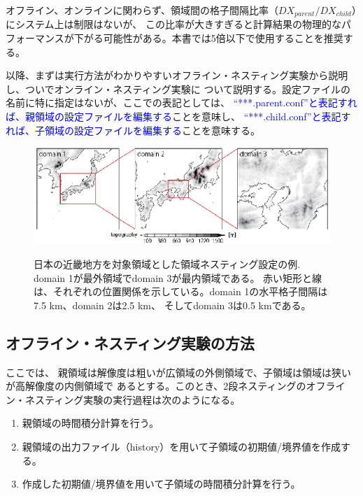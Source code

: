 オフライン、オンラインに関わらず、領域間の格子間隔比率（$DX_{parent}/DX_{child}$）にシステム上は制限はないが、
この比率が大きすぎると計算結果の物理的なパフォーマンスが下がる可能性がある。本書では5倍以下で使用することを推奨する。

以降、まずは実行方法がわかりやすいオフライン・ネスティング実験から説明し、ついでオンライン・ネスティング実験に
ついて説明する。設定ファイルの名前に特に指定はないが、ここでの表記としては、
\textcolor{blue}{``***.parent.conf''と表記すれば、親領域の設定ファイルを編集する}ことを意味し、
\textcolor{blue}{``***.child.conf''と表記すれば、子領域の設定ファイルを編集する}ことを意味する。


\begin{figure}[t]
\begin{center}
  \includegraphics[width=1.0\hsize]{./figure/nesting_sample.eps}\\
  \caption{日本の近畿地方を対象領域とした領域ネスティング設定の例. domain 1が最外領域でdomain 3が最内領域である。
           赤い矩形と線は、それぞれの位置関係を示している。domain 1の水平格子間隔は7.5 km、domain 2は2.5 km、
           そしてdomain 3は0.5 kmである。}
  \label{fig_nestsample}
\end{center}
\end{figure}


\subsection{オフライン・ネスティング実験の方法} \label{subsec:nest_offline}

ここでは、
親領域は解像度は粗いが広領域の外側領域で、子領域は領域は狭いが高解像度の内側領域で
あるとする。このとき、2段ネスティングのオフライン・ネスティング実験の実行過程は次のようになる。

{\gt
\begin{enumerate}
 \item 親領域の時間積分計算を行う。
 \item 親領域の出力ファイル（history）を用いて子領域の初期値/境界値を作成する。
 \item 作成した初期値/境界値を用いて子領域の時間積分計算を行う。
\end{enumerate}
}

